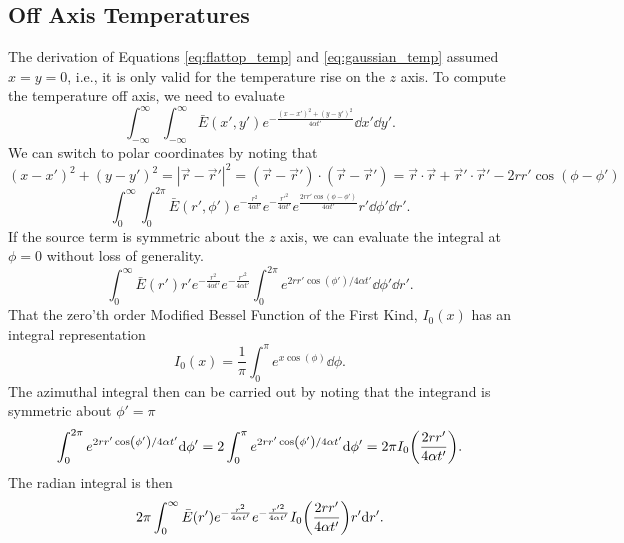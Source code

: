 \documentclass[]{article}
\begin{document}
\subsection{Off Axis Temperatures}
The derivation of Equations \ref{eq:flattop_temp} and \ref{eq:gaussian_temp} assumed $x = y = 0$, i.e., it is only valid for the temperature rise on the $z$ axis.
To compute the temperature off axis, we need to evaluate
\begin{equation*}
  \int_{-\infty}^\infty \int_{-\infty}^\infty \bar{E}(x',y') e^{-\frac{(x-x')^2 + (y-y')^2}{4\alpha t'}} \dd x' \dd y'.
\end{equation*}
We can switch to polar coordinates by noting that $(x-x')^2 + (y-y')^2 = |\vec{r}-\vec{r}'|^2 = (\vec{r}-\vec{r}')\cdot(\vec{r}-\vec{r}') = \vec{r}\cdot\vec{r} + \vec{r}'\cdot\vec{r}' - 2r r' \cos(\phi - \phi')$
\begin{equation*}
  \int_0^\infty \int_0^{2\pi} \bar{E}(r',\phi')  e^{-\frac{r^2}{4\alpha t'}}e^{-\frac{r'^2}{4\alpha t'}}e^{\frac{2rr'\cos(\phi-\phi')}{4\alpha t'}}r' \dd \phi' \dd r'.
\end{equation*}
If the source term is symmetric about the $z$ axis, we can evaluate the integral at $\phi=0$ without loss of generality.
\begin{equation*}
\int_0^\infty \bar{E}(r') r'e^{-\frac{r^2}{4\alpha t'}}e^{-\frac{r'^2}{4\alpha t'}}\int_0^{2\pi} e^{2rr'\cos(\phi')/4\alpha t'} \dd \phi' \dd r'.
\end{equation*}
That the zero'th order Modified Bessel Function of the First Kind, $I_0(x)$ has an integral representation
\begin{equation}
  I_0(x) = \frac{1}{\pi} \int_0^\pi e^{x\cos(\phi)} \dd \phi.
\end{equation}
The azimuthal integral then can be carried out by noting that the integrand is symmetric about $\phi' = \pi$
\begin{equation*}
\int_0^{2\pi}  e^{2rr'\cos(\phi')/4\alpha t'}\dd \phi'
=2\int_0^{\pi}  e^{2rr'\cos(\phi')/4\alpha t'}\dd \phi'
=2\pi I_0\qty(\frac{2rr'}{4\alpha t'}).
\end{equation*}
The radian integral is then
\begin{equation*}
  2\pi \int_0^\infty \bar{E}(r')   e^{-\frac{r^2}{4\alpha t'}}e^{-\frac{r'^2}{4\alpha t'}}I_0\qty(\frac{2rr'}{4\alpha t'}) r'\dd r'.
\end{equation*}
\end{document}
